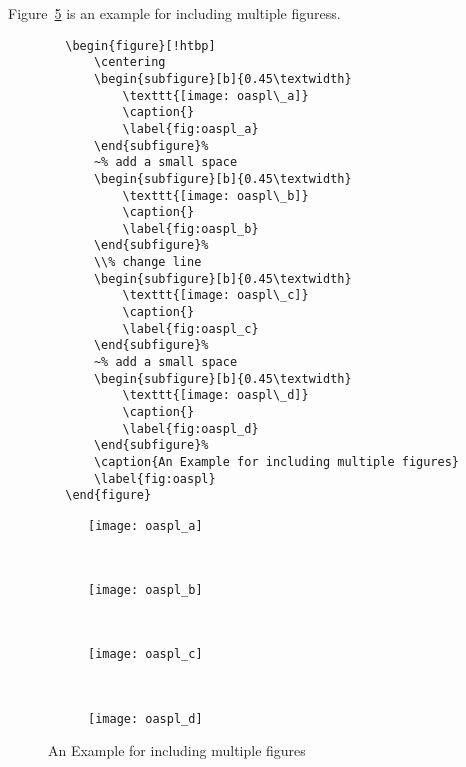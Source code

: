 Figure~\ref{fig:oaspl} is an example for including multiple figuress. 
\begin{center}
    \small
    \begin{verbatim}
        \begin{figure}[!htbp]
            \centering
            \begin{subfigure}[b]{0.45\textwidth}
                \texttt{[image: oaspl\_a]}
                \caption{}
                \label{fig:oaspl_a}
            \end{subfigure}%
            ~% add a small space
            \begin{subfigure}[b]{0.45\textwidth}
                \texttt{[image: oaspl\_b]}
                \caption{}
                \label{fig:oaspl_b}
            \end{subfigure}%
            \\% change line
            \begin{subfigure}[b]{0.45\textwidth}
                \texttt{[image: oaspl\_c]}
                \caption{}
                \label{fig:oaspl_c}
            \end{subfigure}%
            ~% add a small space
            \begin{subfigure}[b]{0.45\textwidth}
                \texttt{[image: oaspl\_d]}
                \caption{}
                \label{fig:oaspl_d}
            \end{subfigure}%
            \caption{An Example for including multiple figures}
            \label{fig:oaspl}
        \end{figure}
    \end{verbatim}
\end{center}
\begin{figure}[!htbp]
    \centering
    \begin{subfigure}[b]{0.45\textwidth}
        \texttt{[image: oaspl\_a]}
        \caption{}
        \label{fig:oaspl_a}
    \end{subfigure}%
    ~%
    \begin{subfigure}[b]{0.45\textwidth}
        \texttt{[image: oaspl\_b]}
        \caption{}
        \label{fig:oaspl_b}
    \end{subfigure}%
    \\%
    \begin{subfigure}[b]{0.45\textwidth}
        \texttt{[image: oaspl\_c]}
        \caption{}
        \label{fig:oaspl_c}
    \end{subfigure}%
    ~%
    \begin{subfigure}[b]{0.45\textwidth}
        \texttt{[image: oaspl\_d]}
        \caption{}
        \label{fig:oaspl_d}
    \end{subfigure}%
    \caption{An Example for including multiple figures}
    \label{fig:oaspl}
\end{figure}

